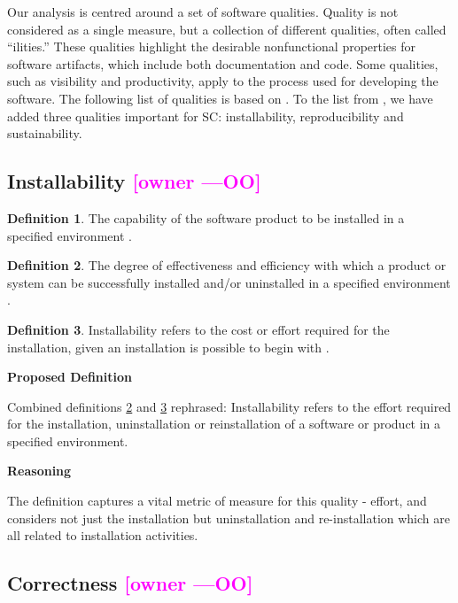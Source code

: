\documentclass[letterpaper,cleveref]{lipics-v2019}
\newcommand{\authornote}[3]{\textcolor{#1}{[#3 ---#2]}}
\newcommand{\authornote}[3]{}
\newcommand{\oo}[1]{\authornote{magenta}{OO}{#1}} %
\theoremstyle{definition}
\newtheorem{defn}{Definition}
\begin{document}
Our analysis is centred around a set of software qualities.  Quality is not
considered as a single measure, but a collection of different qualities, often
called ``ilities.''  These qualities highlight the desirable nonfunctional
properties for software artifacts, which include both documentation and
code. Some qualities, such as visibility and productivity, apply to the process
used for developing the software. The following list of qualities is based on
\cite{GhezziEtAl2003}. To the list from \cite{GhezziEtAl2003}, we have added
three qualities important for SC: installability, reproducibility and
sustainability.

\subsection{{Installability} \oo{owner}}

\begin{defn}
  The capability of the software product to be installed in a specified
  environment \citep{ISO9126}.
\end{defn}

\begin{defn} \label{Installability_Selected2}
	The degree of effectiveness and efficiency with which a product or system can
	be successfully installed and/or uninstalled in a specified environment
	\citep{ISO/IEC25010}.
\end{defn}

\begin{defn} \label{Installability_Selected1} Installability refers to the cost
  or effort required for the installation, given an installation is possible to
  begin with \citep{lenhard2013measuring}.
\end{defn}

\noindent \textbf{Proposed Definition}

Combined definitions \ref{Installability_Selected2} and
\ref{Installability_Selected1} rephrased:
 Installability refers to the
effort required for the installation, uninstallation or reinstallation of a
software or product in a specified environment.

\noindent \textbf{Reasoning}

 The definition captures a vital metric of measure for this quality - 
 effort, and considers not just the installation but uninstallation
 and re-installation which are all related to installation activities.

\subsection{{Correctness} \oo{owner}}
\end{document}
